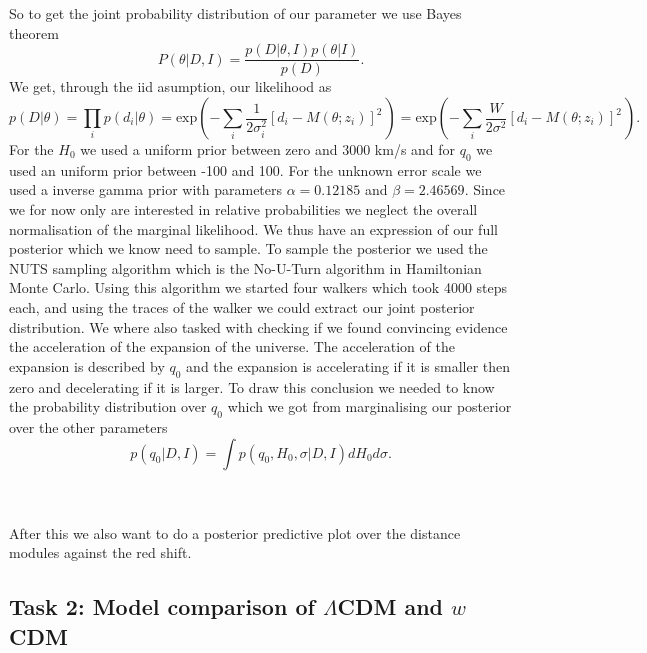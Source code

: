 \documentclass[11pt,a4paper]{article}
\begin{document}
\\\\
So to get the joint probability distribution of our parameter we use Bayes theorem 
\begin{equation*}
    P(\theta| D, I) =  \frac{p(D|\theta, I)p(\theta|I)}{p(D)}.
\end{equation*}
We get, through the iid asumption, our likelihood as
\begin{equation*}
    p(D|\theta) =  \prod_i p(d_i|\theta) = \text{exp}\left(-\sum_i \frac{1}{2\sigma_i^2}\left[d_i - M(\theta;z_i)\right]^2\frac{}{}\right) =  \text{exp}\left(-\sum_i \frac{W}{2\sigma^2}\left[d_i - M(\theta;z_i)\right]^2\frac{}{}\right).
\end{equation*}
For the $H_0$ we used a uniform prior between zero and 3000 km/s and for $q_0$ we used an uniform prior between -100 and 100. For the unknown error scale we used a inverse gamma prior with parameters $\alpha = 0.12185$ and $\beta = 2.46569$. Since we for now only are interested in relative probabilities we neglect the overall normalisation of the marginal likelihood. We thus have an expression of our full posterior which we know need to sample. To sample the posterior we used the NUTS sampling algorithm which is the No-U-Turn algorithm in Hamiltonian Monte Carlo. Using this algorithm we started four walkers which took 4000 steps each, and using the traces of the walker we could extract our joint posterior distribution. We where also tasked with checking if we 
found convincing evidence the acceleration of the expansion of the universe. The acceleration of the expansion is described by $q_0$ and the expansion is accelerating if it is smaller then zero and decelerating if it is larger. To draw this conclusion we needed to know the probability distribution over $q_0$ which we got from marginalising our posterior over the other parameters
\begin{equation*}
    p(q_0|D,I) = \int p(q_0,H_0, \sigma|D,I) d H_0 d\sigma.
\end{equation*}

\\\\
After this we also want to do a posterior predictive plot over the distance modules against the red shift. 

\subsection[Task 2]{Task 2: Model comparison of $\Lambda$CDM and $w$CDM}
\end{document}
